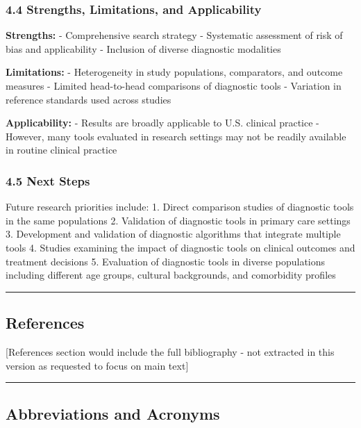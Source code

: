 \documentclass[
  12pt,
  letterpaper,
]{article}
\renewcommand{\[}{\begin{singlespace}\oldDisplayMath}
\renewcommand{\]}{\endoldDisplayMath\end{singlespace}\vspace{\baselineskip}}
\begin{document}
\subsubsection{4.4 Strengths, Limitations, and
Applicability}\label{strengths-limitations-and-applicability}

\textbf{Strengths:} - Comprehensive search strategy - Systematic
assessment of risk of bias and applicability - Inclusion of diverse
diagnostic modalities

\textbf{Limitations:} - Heterogeneity in study populations, comparators,
and outcome measures - Limited head-to-head comparisons of diagnostic
tools - Variation in reference standards used across studies

\textbf{Applicability:} - Results are broadly applicable to U.S.
clinical practice - However, many tools evaluated in research settings
may not be readily available in routine clinical practice

\subsubsection{4.5 Next Steps}\label{next-steps}

Future research priorities include: 1. Direct comparison studies of
diagnostic tools in the same populations 2. Validation of diagnostic
tools in primary care settings 3. Development and validation of
diagnostic algorithms that integrate multiple tools 4. Studies examining
the impact of diagnostic tools on clinical outcomes and treatment
decisions 5. Evaluation of diagnostic tools in diverse populations
including different age groups, cultural backgrounds, and comorbidity
profiles

\begin{center}\rule{0.5\linewidth}{0.5pt}\end{center}

\subsection{References}\label{references}

{[}References section would include the full bibliography - not
extracted in this version as requested to focus on main text{]}

\begin{center}\rule{0.5\linewidth}{0.5pt}\end{center}

\subsection{Abbreviations and
Acronyms}\label{abbreviations-and-acronyms}
\end{document}
